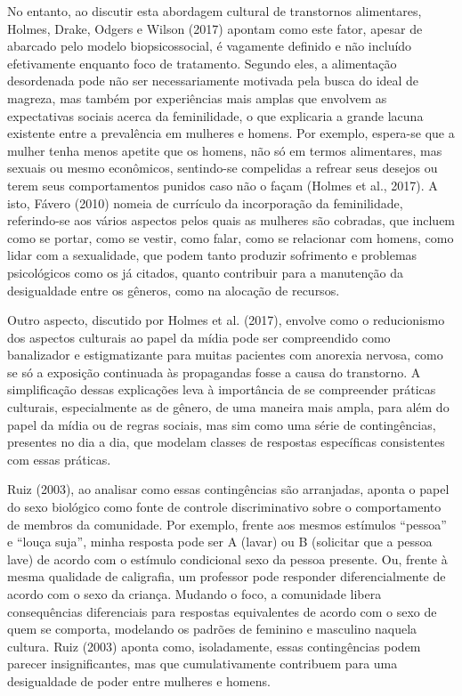 No entanto, ao discutir esta abordagem cultural de transtornos alimentares, Holmes, Drake, Odgers e Wilson (2017) apontam como este fator, apesar de abarcado pelo modelo biopsicossocial, é vagamente definido e não incluído efetivamente enquanto foco de tratamento. Segundo eles, a alimentação desordenada pode não ser necessariamente motivada pela busca do ideal de magreza, mas também por experiências mais amplas que envolvem as expectativas sociais acerca da feminilidade, o que explicaria a grande lacuna existente entre a prevalência em mulheres e homens. Por exemplo, espera-se que a mulher tenha menos apetite que os homens, não só em termos alimentares, mas sexuais ou mesmo econômicos, sentindo-se compelidas a refrear seus desejos ou terem seus comportamentos punidos caso não o façam (Holmes et al., 2017). A isto, Fávero (2010) nomeia de currículo da incorporação da feminilidade, referindo-se aos vários aspectos pelos quais as mulheres são cobradas, que incluem como se portar, como se vestir, como falar, como se relacionar com homens, como lidar com a sexualidade, que podem tanto produzir sofrimento e problemas psicológicos como os já citados, quanto contribuir para a manutenção da desigualdade entre os gêneros, como na alocação de recursos.

Outro aspecto, discutido por Holmes et al. (2017), envolve como o reducionismo dos aspectos culturais ao papel da mídia pode ser compreendido como banalizador e estigmatizante para muitas pacientes com anorexia nervosa, como se só a exposição continuada às propagandas fosse a causa do transtorno. A simplificação dessas explicações leva à importância de se compreender práticas culturais, especialmente as de gênero, de uma maneira mais ampla, para além do papel da mídia ou de regras sociais, mas sim como uma série de contingências, presentes no dia a dia, que modelam classes de respostas específicas consistentes com essas práticas.

Ruiz (2003), ao analisar como essas contingências são arranjadas, aponta o papel do sexo biológico como fonte de controle discriminativo sobre o comportamento de membros da comunidade. Por exemplo, frente aos mesmos estímulos ``pessoa'' e ``louça suja'', minha resposta pode ser A (lavar) ou B (solicitar que a pessoa lave) de acordo com o estímulo condicional sexo da pessoa presente. Ou, frente à mesma qualidade de caligrafia, um professor pode responder diferencialmente de acordo com o sexo da criança. Mudando o foco, a comunidade libera consequências diferenciais para respostas equivalentes de acordo com o sexo de quem se comporta, modelando os padrões de feminino e masculino naquela cultura. Ruiz (2003) aponta como, isoladamente, essas contingências podem parecer insignificantes, mas que cumulativamente contribuem para uma desigualdade de poder entre mulheres e homens. 

